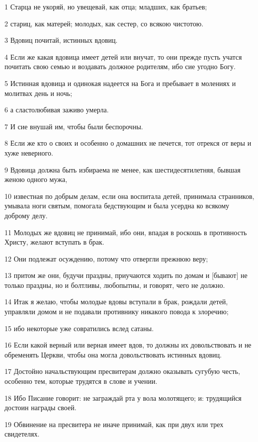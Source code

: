 \par 1 Старца не укоряй, но увещевай, как отца; младших, как братьев;
\par 2 стариц, как матерей; молодых, как сестер, со всякою чистотою.
\par 3 Вдовиц почитай, истинных вдовиц.
\par 4 Если же какая вдовица имеет детей или внучат, то они прежде пусть учатся почитать свою семью и воздавать должное родителям, ибо сие угодно Богу.
\par 5 Истинная вдовица и одинокая надеется на Бога и пребывает в молениях и молитвах день и ночь;
\par 6 а сластолюбивая заживо умерла.
\par 7 И сие внушай им, чтобы были беспорочны.
\par 8 Если же кто о своих и особенно о домашних не печется, тот отрекся от веры и хуже неверного.
\par 9 Вдовица должна быть избираема не менее, как шестидесятилетняя, бывшая женою одного мужа,
\par 10 известная по добрым делам, если она воспитала детей, принимала странников, умывала ноги святым, помогала бедствующим и была усердна ко всякому доброму делу.
\par 11 Молодых же вдовиц не принимай, ибо они, впадая в роскошь в противность Христу, желают вступать в брак.
\par 12 Они подлежат осуждению, потому что отвергли прежнюю веру;
\par 13 притом же они, будучи праздны, приучаются ходить по домам и [бывают] не только праздны, но и болтливы, любопытны, и говорят, чего не должно.
\par 14 Итак я желаю, чтобы молодые вдовы вступали в брак, рождали детей, управляли домом и не подавали противнику никакого повода к злоречию;
\par 15 ибо некоторые уже совратились вслед сатаны.
\par 16 Если какой верный или верная имеет вдов, то должны их довольствовать и не обременять Церкви, чтобы она могла довольствовать истинных вдовиц.
\par 17 Достойно начальствующим пресвитерам должно оказывать сугубую честь, особенно тем, которые трудятся в слове и учении.
\par 18 Ибо Писание говорит: не заграждай рта у вола молотящего; и: трудящийся достоин награды своей.
\par 19 Обвинение на пресвитера не иначе принимай, как при двух или трех свидетелях.

